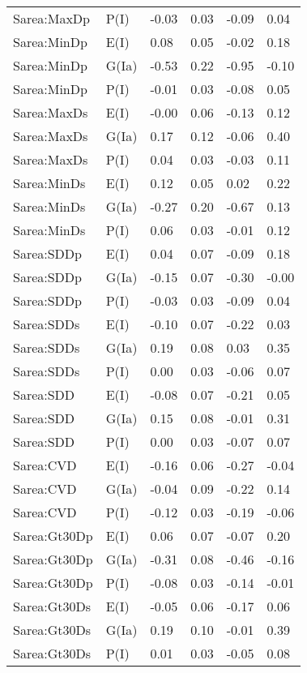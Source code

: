 \begin{center}
\begin{longtable}{|p{1.1in}|p{0.7in}|p{0.7in}|p{0.6in}|p{0.6in}|p{0.6in}|}
  Sarea:MaxDp & P(I) & -0.03 & 0.03 & -0.09 & 0.04 \\ 
  Sarea:MinDp & E(I) & 0.08 & 0.05 & -0.02 & 0.18 \\ 
  Sarea:MinDp & G(Ia) & -0.53 & 0.22 & -0.95 & -0.10 \\ 
  Sarea:MinDp & P(I) & -0.01 & 0.03 & -0.08 & 0.05 \\ 
  Sarea:MaxDs & E(I) & -0.00 & 0.06 & -0.13 & 0.12 \\ 
  Sarea:MaxDs & G(Ia) & 0.17 & 0.12 & -0.06 & 0.40 \\ 
  Sarea:MaxDs & P(I) & 0.04 & 0.03 & -0.03 & 0.11 \\ 
  Sarea:MinDs & E(I) & 0.12 & 0.05 & 0.02 & 0.22 \\ 
  Sarea:MinDs & G(Ia) & -0.27 & 0.20 & -0.67 & 0.13 \\ 
  Sarea:MinDs & P(I) & 0.06 & 0.03 & -0.01 & 0.12 \\ 
  Sarea:SDDp & E(I) & 0.04 & 0.07 & -0.09 & 0.18 \\ 
  Sarea:SDDp & G(Ia) & -0.15 & 0.07 & -0.30 & -0.00 \\ 
  Sarea:SDDp & P(I) & -0.03 & 0.03 & -0.09 & 0.04 \\ 
  Sarea:SDDs & E(I) & -0.10 & 0.07 & -0.22 & 0.03 \\ 
  Sarea:SDDs & G(Ia) & 0.19 & 0.08 & 0.03 & 0.35 \\ 
  Sarea:SDDs & P(I) & 0.00 & 0.03 & -0.06 & 0.07 \\ 
  Sarea:SDD & E(I) & -0.08 & 0.07 & -0.21 & 0.05 \\ 
  Sarea:SDD & G(Ia) & 0.15 & 0.08 & -0.01 & 0.31 \\ 
  Sarea:SDD & P(I) & 0.00 & 0.03 & -0.07 & 0.07 \\ 
  Sarea:CVD & E(I) & -0.16 & 0.06 & -0.27 & -0.04 \\ 
  Sarea:CVD & G(Ia) & -0.04 & 0.09 & -0.22 & 0.14 \\ 
  Sarea:CVD & P(I) & -0.12 & 0.03 & -0.19 & -0.06 \\ 
  Sarea:Gt30Dp & E(I) & 0.06 & 0.07 & -0.07 & 0.20 \\ 
  Sarea:Gt30Dp & G(Ia) & -0.31 & 0.08 & -0.46 & -0.16 \\ 
  Sarea:Gt30Dp & P(I) & -0.08 & 0.03 & -0.14 & -0.01 \\ 
  Sarea:Gt30Ds & E(I) & -0.05 & 0.06 & -0.17 & 0.06 \\ 
  Sarea:Gt30Ds & G(Ia) & 0.19 & 0.10 & -0.01 & 0.39 \\ 
  Sarea:Gt30Ds & P(I) & 0.01 & 0.03 & -0.05 & 0.08 \\ 

\end{longtable}
\end{center}
